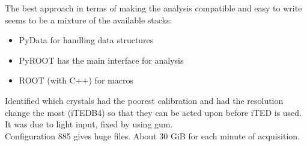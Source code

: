\vfill
\begin{minipage}[t][0.2\textheight][t]{0.97\linewidth}
    The best approach in terms of making the analysis compatible and easy to write seems to be a mixture of the available stacks:
    \begin{itemize}
      \item PyData for handling data structures
      \item PyROOT has the main interface for analysis
      \item ROOT (with C++) for macros
    \end{itemize}
    Identified which crystals had the poorest calibration and had the resolution change the most (iTEDB4) so that they can be acted upon before iTED is used. It was due to light input, fixed by using gum.\\
    Configuration 885 gives huge files. About 30 GiB for each minute of acquisition.
\end{minipage}

\newpage
